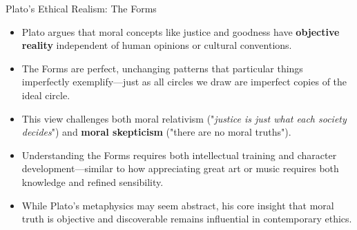 \documentclass[aspectratio=169]{beamer}
\begin{document}
\begin{frame}{Plato's Ethical Realism: The Forms}
\begin{itemize}
\item Plato argues that moral concepts like justice and goodness have \textbf{objective reality} independent of human opinions or cultural conventions.
\item The Forms are perfect, unchanging patterns that particular things imperfectly exemplify—just as all circles we draw are imperfect copies of the ideal circle.
\item This view challenges both moral relativism ("\emph{justice is just what each society decides}") and \textbf{moral skepticism} ("there are no moral truths").
\item Understanding the Forms requires both intellectual training and character development—similar to how appreciating great art or music requires both knowledge and refined sensibility.
\item While Plato's metaphysics may seem abstract, his core insight that moral truth is objective and discoverable remains influential in contemporary ethics.
\end{itemize}
\end{frame}
\end{document}
